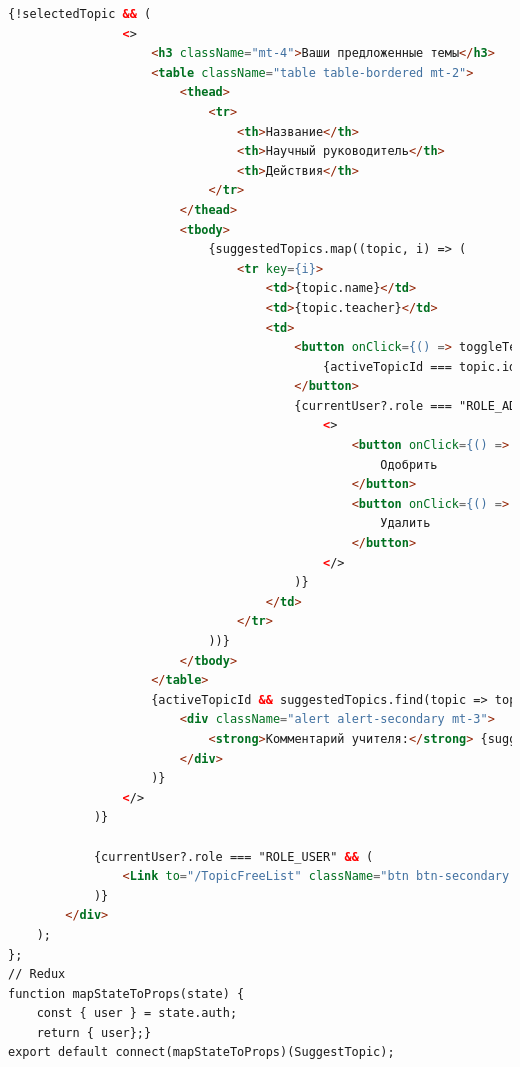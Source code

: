 \documentclass[14pt]{extarticle} %
\begin{document}
\begin{lstlisting}[language=html, caption={Клиентская часть SuggestTopic}]
            {!selectedTopic && (
                <>
                    <h3 className="mt-4">Ваши предложенные темы</h3>
                    <table className="table table-bordered mt-2">
                        <thead>
                            <tr>
                                <th>Название</th>
                                <th>Научный руководитель</th>
                                <th>Действия</th>
                            </tr>
                        </thead>
                        <tbody>
                            {suggestedTopics.map((topic, i) => (
                                <tr key={i}>
                                    <td>{topic.name}</td>
                                    <td>{topic.teacher}</td>
                                    <td>
                                        <button onClick={() => toggleTeacherComment(topic.id)} className="btn btn-secondary ms-2">
                                            {activeTopicId === topic.id ? "Скрыть комментарий" : "Комментарий учителя"}
                                        </button>
                                        {currentUser?.role === "ROLE_ADMIN" && (
                                            <>
                                                <button onClick={() => handleApprove(topic.id)} className="btn btn-success ms-2">
                                                    Одобрить
                                                </button>
                                                <button onClick={() => handleDelete(topic.id)} className="btn btn-danger ms-2">
                                                    Удалить
                                                </button>
                                            </>
                                        )}
                                    </td>
                                </tr>
                            ))}
                        </tbody>
                    </table>
                    {activeTopicId && suggestedTopics.find(topic => topic.id === activeTopicId)?.comment && (
                        <div className="alert alert-secondary mt-3">
                            <strong>Комментарий учителя:</strong> {suggestedTopics.find(topic => topic.id === activeTopicId).comment}
                        </div>
                    )}
                </>
            )}

            {currentUser?.role === "ROLE_USER" && (
                <Link to="/TopicFreeList" className="btn btn-secondary mt-3">Назад к свободным темам</Link>
            )}
        </div>
    );
};
// Redux
function mapStateToProps(state) {
    const { user } = state.auth;
    return { user};}
export default connect(mapStateToProps)(SuggestTopic);
\end{lstlisting}
\end{document}
